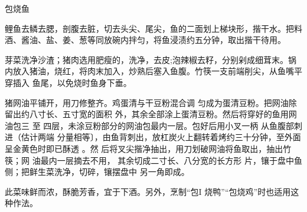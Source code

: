 \begin{recipe}{包烧鱼}

\ingredients


\cooking

\step 鲤鱼去鳞去腮，剖腹去脏，切去头尖、尾尖，鱼的二面划上梯块形，揩干水。把料
酒、酱油、盐、姜、葱等同放碗内拌匀，将鱼浸渍约五分钟，取出揩干待用。

\step 芽菜洗净沙渣；猪肉选用肥瘦的，洗净，去皮;泡辣椒去籽，分别剁成细茸末。锅
内放入猪油，烧红，将肉末加入，炒熟后塞入鱼腹。竹筷一支前端削尖，从鱼嘴平穿插入
鱼尾，以免烧时鱼身下垂。

\step 猪网油平铺开，用刀修整齐。鸡蛋清与干豆粉混合调 匀成为蛋清豆粉。把网油除
留出约八寸长、五寸宽的面积 外，其余全部涂上蛋清豆粉。然后将穿好的鱼用网油包三
至 四层，未涂豆粉部分的网油包最内一层。包好后用小叉一柄 从鱼腹部刺进（估计两端
分量相等〕，由鱼背刺出，放杠炭火上翻转着烤约三十分钟，至外面呈金黄色时即已酥透
。然 后将叉尖揩净抽出，用刀划破网油将鱼取出，抽出竹筷；网 油最内一层摘去不用，
其余切成二寸长、八分宽的长方形 片，镶于盘中鱼侧；把鲜生菜洗净，切碎，镶摆盘中
另一角即成。

\notes

此菜味鲜而浓，酥脆芳香，宜于下酒。另外，烹制“包I 烧鸭”“包烧鸡”时也适用这种作法。

\end{recipe}

